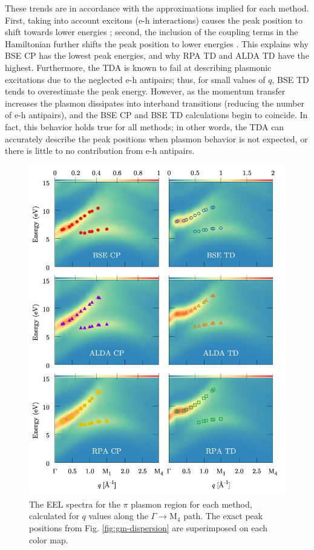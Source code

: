 \documentclass[aps,prb,10pt,showpacs,superscriptaddress,twocolumn,notitlepage]{revtex4-1}
\begin{document}
These trends are in accordance with the approximations implied for each method.
First, taking into account excitons (e-h interactions) causes the peak position
to shift towards lower energies \cite{albrechtPRL98}; second, the inclusion of
the coupling terms in the Hamiltonian further shifts the peak position to lower
energies \cite{olevanoPRL01, gruningNL09}. This explains why BSE CP has the
lowest peak energies, and why RPA TD and ALDA TD have the highest. Furthermore,
the TDA is known to fail at describing plasmonic excitations
\cite{zimmermannPSSB70, caliebePRL00, olevanoPRL01, gruningNL09} due to the
neglected e-h antipairs; thus, for small values of $q$, BSE TD tends to
overestimate the peak energy. However, as the momentum transfer increases the
plasmon dissipates into interband transitions (reducing the number of e-h
antipairs), and the BSE CP and BSE TD calculations begin to coincide. In fact,
this behavior holds true for all methods; in other words, the TDA can accurately
describe the peak positions when plasmon behavior is not expected, or there is
little to no contribution from e-h antipairs.

\begin{figure}[t]
\includegraphics[width=\linewidth]{fig06}
\caption{The EEL spectra for the $\pi$ plasmon region for each method, calculated
for $q$ values along the $\Gamma \rightarrow \mathrm{M}_{4}$ path. The exact
peak positions from Fig. \ref{fig:gm-dispersion} are superimposed on each color
map.}
\label{fig:gm-heatmap_lo}
\end{figure}
\end{document}
